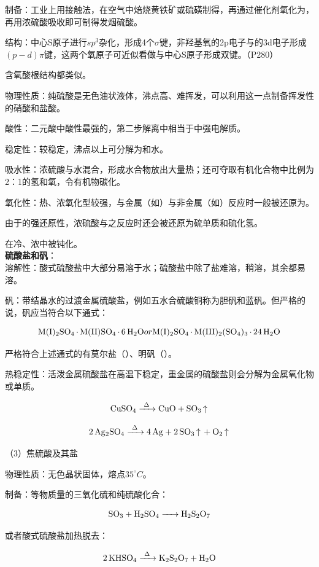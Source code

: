 \documentclass[a4paper,UTF8]{article}
\begin{document}
制备：工业上用接触法，在空气中焙烧黄铁矿或硫磺制得，再通过催化剂氧化为，再用浓硫酸吸收即可制得发烟硫酸。

结构：中心S原子进行$sp^3$杂化，形成4个$\sigma$键，非羟基氧的2p电子与的3d电子形成$(p-d)\pi 键$，这两个氧原子可近似看做与中心S原子形成双键。（P280）

含氧酸根结构都类似。

物理性质：纯硫酸是无色油状液体，沸点高、难挥发，可以利用这一点制备挥发性的硝酸和盐酸。

酸性：二元酸中酸性最强的，第二步解离中相当于中强电解质。

稳定性：较稳定，沸点以上可分解为和水。

吸水性：浓硫酸与水混合，形成水合物放出大量热；还可夺取有机化合物中比例为2：1的氢和氧，令有机物碳化。

氧化性：热、浓氧化型较强，与金属（如）与非金属（如）反应时一般被还原为。

由于的强还原性，浓硫酸与之反应时还会被还原为硫单质和硫化氢。

在冷、浓中被钝化。\\

\textbf{硫酸盐和矾}：\\

溶解性：酸式硫酸盐中大部分易溶于水；硫酸盐中除了盐难溶，稍溶，其余都易溶。

矾：带结晶水的过渡金属硫酸盐，例如五水合硫酸铜称为胆矾和蓝矾。但严格的说，矾应当符合以下通式：

$$ \ce{M(I)2SO4 * M(II)SO4 * 6H2O} or \ce{M(I)2SO4 * M(III)2(SO4)3 * 24H2O}$$

严格符合上述通式的有莫尔盐（）、明矾（）。

热稳定性：活泼金属硫酸盐在高温下稳定，重金属的硫酸盐则会分解为金属氧化物或单质。

$$ \ce{CuSO4 ->[\Delta] CuO + SO3 ^} $$

$$ \ce{2Ag2SO4 ->[\Delta] 4Ag + 2SO3 ^ + O2 ^} $$

（3）焦硫酸及其盐

物理性质：无色晶状固体，熔点$35^\circ C$。

制备：等物质量的三氧化硫和纯硫酸化合：

$$ \ce{SO3 + H2SO4 -> H2S2O7} $$

或者酸式硫酸盐加热脱去：

$$ \ce{2KHSO4 ->[\Delta] K2S2O7 + H2O} $$
\end{document}
